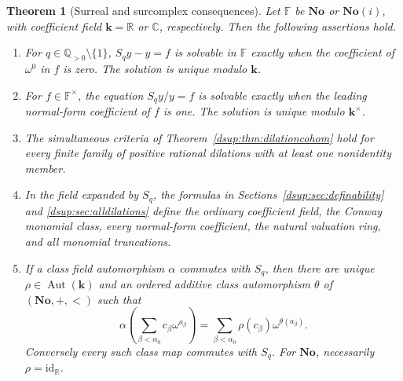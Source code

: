 \documentclass[11pt,oneside]{article}
\numberwithin{equation}{section}
\newtheorem{theorem}{Theorem}[section]
\theoremstyle{definition}
\theoremstyle{remark}
\newcommand{\No}{\mathbf{No}}
\newcommand{\SC}{\No(i)}
\newcommand{\R}{\mathbb R}
\newcommand{\C}{\mathbb C}
\newcommand{\Q}{\mathbb Q}
\newcommand{\kk}{\mathbf k}
\newcommand{\id}{\mathrm{id}}
\newcommand{\Aut}{\operatorname{Aut}}
\begin{document}
\begin{theorem}[Surreal and surcomplex consequences]\label{dsup:thm:surreal}
Let $\mathbb F$ be $\No$ or $\SC$, with coefficient field $\kk=\R$ or
$\C$, respectively. Then the following assertions hold.
\begin{enumerate}[leftmargin=*,itemsep=4pt]
\item For $q\in\Q_{>0}\setminus\{1\}$,
$S_qy-y=f$ is solvable in $\mathbb F$ exactly when the coefficient of
$\omega^0$ in $f$ is zero. The solution is unique modulo $\kk$.
\item For $f\in\mathbb F^\times$, the equation $S_qy/y=f$ is solvable
exactly when the leading normal-form coefficient of $f$ is one. The
solution is unique modulo $\kk^\times$.
\item The simultaneous criteria of Theorem~\ref{dsup:thm:dilationcohom} hold
for every finite family of positive rational dilations with at least
one nonidentity member.
\item In the field expanded by $S_q$, the formulas in
Sections~\ref{dsup:sec:definability} and \ref{dsup:sec:alldilations} define the
ordinary coefficient field, the Conway monomial class, every normal-form
coefficient, the natural valuation ring, and all monomial truncations.
\item If a class field automorphism $\alpha$ commutes with $S_q$, then
there are unique $\rho\in\Aut(\kk)$ and an ordered additive class
automorphism $\theta$ of $(\No,+,<)$ such that
\begin{equation}\label{dsup:eq:surrealcentralizer}
 \alpha\left(\sum_{\beta<\alpha_0}c_\beta\omega^{a_\beta}\right)
      =\sum_{\beta<\alpha_0}\rho(c_\beta)\omega^{\theta(a_\beta)}.
\end{equation}
Conversely every such class map commutes with $S_q$. For $\No$, necessarily
$\rho=\id_\R$.
\end{enumerate}
\end{theorem}
\end{document}
